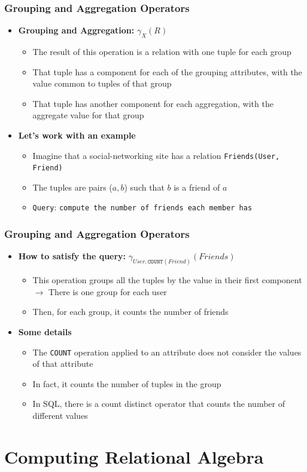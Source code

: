 \documentclass{beamer}
\newcommand{\bi}{\begin{itemize}}
\newcommand{\ei}{\end{itemize}}
\newcommand{\ii}{\item}
\newcommand*{\myblue}[1]{\textcolor{myblue}{#1}}
\begin{document}



\begin{frame}
\frametitle{Grouping and Aggregation Operators}
\bi
\ii \textbf{Grouping and Aggregation:} $\gamma_X (R)$
\bi
\ii The result of this operation is a relation with one tuple for each group
\ii That tuple has a component for each of the grouping attributes, with the value common to tuples of that group
\ii That tuple has another component for each aggregation, with the aggregate value for that group
\ei
\ei
\bi
\ii \textbf{Let's work with an example} 
\bi
\ii Imagine that a social-networking site has a relation \texttt{Friends(User, Friend)}
\ii The tuples are pairs ($a, b$) such that $b$ is a friend of $a$
\ii \texttt{Query}: \texttt{compute the number of friends each member has}
\ei
\ei
\end{frame}



\begin{frame}
\frametitle{Grouping and Aggregation Operators}
\bi
\ii \textbf{How to satisfy the query:} $\gamma_{User, \texttt{COUNT}(Friend)} (Friends)$
\bi
\ii This operation groups all the tuples by the value in their first component\\ 
$\rightarrow$ There is one group for each user
\ii Then, for each group, it counts the number of friends
\ei
\ei
\bi
\ii \textbf{Some details} 
\bi
\ii The \texttt{COUNT} operation applied to an attribute does not consider the values of that attribute
\ii In fact, it counts the number of tuples in the group
\ii In SQL, there is a \myblue{count distinct} operator that counts the number of different values
\ei
\ei
\end{frame}


\section{Computing Relational Algebra} 

\end{document}
